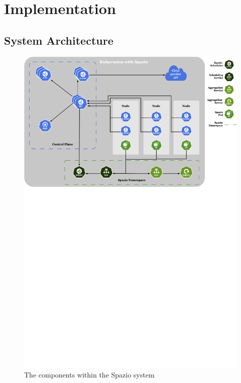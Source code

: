\chapter{Implementation}

\section{System Architecture}
\label{sec:sys-arch}

\begin{figure}[H]
    \centering
    \includegraphics[width=\textwidth]{images/spazio-svg.png}
    \caption{The components within the Spazio system}
    \label{fig:spazio-system}
\end{figure}

